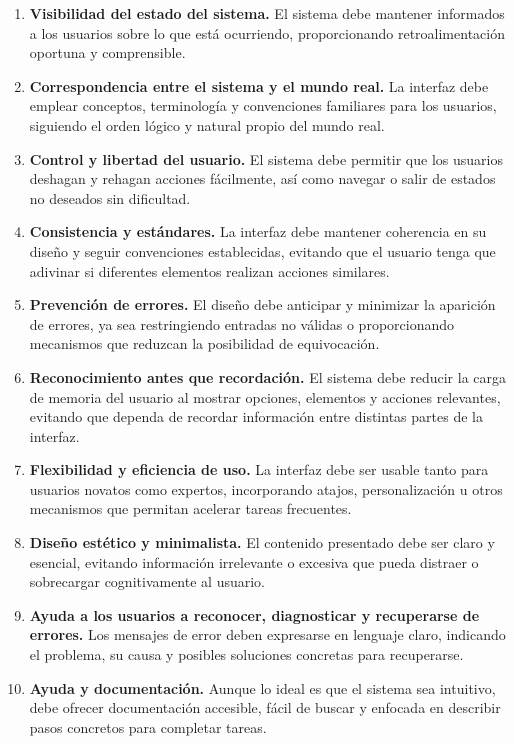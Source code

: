 \begin{enumerate}
    \item \textbf{Visibilidad del estado del sistema.} 
    El sistema debe mantener informados a los usuarios sobre lo que está ocurriendo, proporcionando retroalimentación oportuna y comprensible.

    \item \textbf{Correspondencia entre el sistema y el mundo real.}
    La interfaz debe emplear conceptos, terminología y convenciones familiares para los usuarios, siguiendo el orden lógico y natural propio del mundo real.

    \item \textbf{Control y libertad del usuario.}
    El sistema debe permitir que los usuarios deshagan y rehagan acciones fácilmente, así como navegar o salir de estados no deseados sin dificultad.

    \item \textbf{Consistencia y estándares.}
    La interfaz debe mantener coherencia en su diseño y seguir convenciones establecidas, evitando que el usuario tenga que adivinar si diferentes elementos realizan acciones similares.

    \item \textbf{Prevención de errores.}
    El diseño debe anticipar y minimizar la aparición de errores, ya sea restringiendo entradas no válidas o proporcionando mecanismos que reduzcan la posibilidad de equivocación.

    \item \textbf{Reconocimiento antes que recordación.}
    El sistema debe reducir la carga de memoria del usuario al mostrar opciones, elementos y acciones relevantes, evitando que dependa de recordar información entre distintas partes de la interfaz.

    \item \textbf{Flexibilidad y eficiencia de uso.}
    La interfaz debe ser usable tanto para usuarios novatos como expertos, incorporando atajos, personalización u otros mecanismos que permitan acelerar tareas frecuentes.

    \item \textbf{Diseño estético y minimalista.}
    El contenido presentado debe ser claro y esencial, evitando información irrelevante o excesiva que pueda distraer o sobrecargar cognitivamente al usuario.

    \item \textbf{Ayuda a los usuarios a reconocer, diagnosticar y recuperarse de errores.}
    Los mensajes de error deben expresarse en lenguaje claro, indicando el problema, su causa y posibles soluciones concretas para recuperarse.

    \item \textbf{Ayuda y documentación.}
    Aunque lo ideal es que el sistema sea intuitivo, debe ofrecer documentación accesible, fácil de buscar y enfocada en describir pasos concretos para completar tareas.
\end{enumerate}

